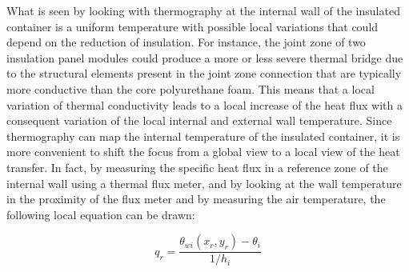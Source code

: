 \documentclass{tQRT2e}
\begin{document}
What is seen by looking with thermography at the internal wall of the insulated container is a uniform temperature with possible local variations that could depend on the reduction of insulation. For instance, the joint zone of two insulation panel modules could produce a more or less severe thermal bridge due to the structural elements present in the joint zone connection that are typically more conductive than the core polyurethane foam. This means that a local variation of thermal conductivity leads to a local increase of the heat flux with a consequent variation of the local internal and external wall temperature. Since thermography can map the internal temperature of the insulated container, it is more convenient to shift the focus from a global view to a local view of the heat transfer. In fact, by measuring the specific heat flux in a reference zone of the internal wall using a thermal flux meter, and by looking at the wall temperature in the proximity of the flux meter and by measuring the air temperature, the following local equation can be drawn:

\begin{equation}
q_r=\frac{\theta_{wi}(x_r,y_r )-\theta_i}{1/h_i}
\end{equation}
\end{document}
